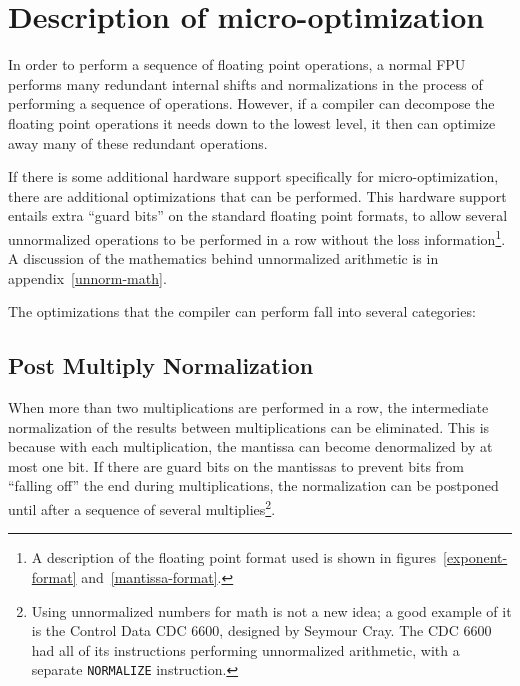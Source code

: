 \section{Description of micro-optimization}\label{ch1:opts}

In order to perform a sequence of floating point operations, a normal FPU
performs many redundant internal shifts and normalizations in the process of
performing a sequence of operations.  However, if a compiler can
decompose the floating point operations it needs down to the lowest level,
it then can optimize away many of these redundant operations.  

If there is some additional hardware support specifically for
micro-optimization, there are additional optimizations that can be
performed.  This hardware support entails extra ``guard bits'' on the
standard floating point formats, to allow several unnormalized operations to
be performed in a row without the loss information\footnote{A description of
the floating point format used is shown in figures~\ref{exponent-format}
and~\ref{mantissa-format}.}.  A discussion of the mathematics behind
unnormalized arithmetic is in appendix~\ref{unnorm-math}.

The optimizations that the compiler can perform fall into several categories:

\subsection{Post Multiply Normalization}

When more than two multiplications are performed in a row, the intermediate
normalization of the results between multiplications can be eliminated.
This is because with each multiplication, the mantissa can become
denormalized by at most one bit.  If there are guard bits on the mantissas
to prevent bits from ``falling off'' the end during multiplications, the
normalization can be postponed until after a sequence of several
multiplies\footnote{Using unnormalized numbers for math is not a new idea; a
good example of it is the Control Data CDC 6600, designed by Seymour Cray.
\cite{thornton:cdc6600} The CDC 6600 had all of its instructions performing
unnormalized arithmetic, with a separate {\tt NORMALIZE} instruction.}.

%

